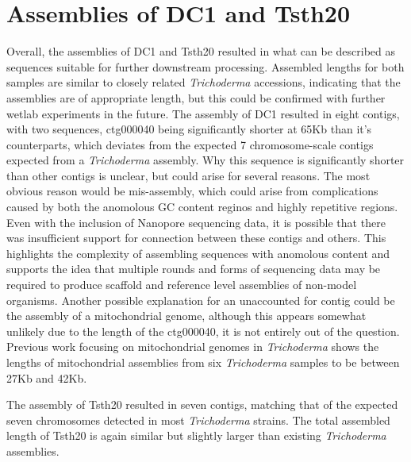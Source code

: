 \section{Assemblies of DC1 and Tsth20}

Overall, the assemblies of DC1 and Tsth20 resulted in what can be
described as sequences suitable for further downstream
processing. Assembled lengths for both samples are similar to closely
related \textit{Trichoderma} accessions, indicating that the
assemblies are of appropriate length, but this could be confirmed with
further wetlab experiments in the future. The assembly of DC1 resulted
in eight contigs, with two sequences, ctg000040 being significantly
shorter at 65Kb than it's counterparts, which deviates from the
expected 7 chromosome-scale contigs expected from a
\textit{Trichoderma} assembly\cite{Kubicek2019}. Why this sequence is
significantly shorter than other contigs is unclear, but could arise
for several reasons. The most obvious reason would be mis-assembly,
which could arise from complications caused by both the anomolous GC
content reginos and highly repetitive regions. Even with the
inclusion of Nanopore sequencing data, it is possible that there was
insufficient support for connection between these contigs and
others. This highlights the complexity of assembling sequences with
anomolous content and supports the idea that multiple rounds and forms
of sequencing data may be required to produce scaffold and reference
level assemblies of non-model organisms. Another possible explanation
for an unaccounted for contig could be the assembly of a mitochondrial
genome, although this appears somewhat unlikely due to the length of
the ctg000040, it is not entirely out of the question. Previous work
focusing on mitochondrial genomes in \textit{Trichoderma} shows the
lengths of mitochondrial assemblies from six \textit{Trichoderma}
samples to be between 27Kb and 42Kb.

The assembly of Tsth20 resulted in seven contigs, matching that of the
expected seven chromosomes detected in most \textit{Trichoderma}
strains. The total assembled length of Tsth20 is again similar but
slightly larger than existing \textit{Trichoderma} assemblies.
